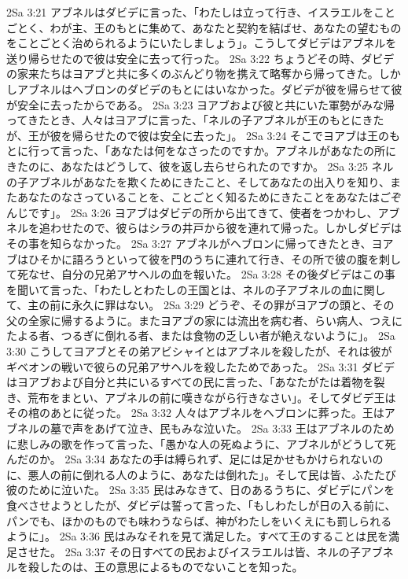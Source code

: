 2Sa 3:21  アブネルはダビデに言った、「わたしは立って行き、イスラエルをことごとく、わが主、王のもとに集めて、あなたと契約を結ばせ、あなたの望むものをことごとく治められるようにいたしましょう」。こうしてダビデはアブネルを送り帰らせたので彼は安全に去って行った。
2Sa 3:22  ちょうどその時、ダビデの家来たちはヨアブと共に多くのぶんどり物を携えて略奪から帰ってきた。しかしアブネルはヘブロンのダビデのもとにはいなかった。ダビデが彼を帰らせて彼が安全に去ったからである。
2Sa 3:23  ヨアブおよび彼と共にいた軍勢がみな帰ってきたとき、人々はヨアブに言った、「ネルの子アブネルが王のもとにきたが、王が彼を帰らせたので彼は安全に去った」。
2Sa 3:24  そこでヨアブは王のもとに行って言った、「あなたは何をなさったのですか。アブネルがあなたの所にきたのに、あなたはどうして、彼を返し去らせられたのですか。
2Sa 3:25  ネルの子アブネルがあなたを欺くためにきたこと、そしてあなたの出入りを知り、またあなたのなさっていることを、ことごとく知るためにきたことをあなたはごぞんじです」。
2Sa 3:26  ヨアブはダビデの所から出てきて、使者をつかわし、アブネルを追わせたので、彼らはシラの井戸から彼を連れて帰った。しかしダビデはその事を知らなかった。
2Sa 3:27  アブネルがヘブロンに帰ってきたとき、ヨアブはひそかに語ろうといって彼を門のうちに連れて行き、その所で彼の腹を刺して死なせ、自分の兄弟アサヘルの血を報いた。
2Sa 3:28  その後ダビデはこの事を聞いて言った、「わたしとわたしの王国とは、ネルの子アブネルの血に関して、主の前に永久に罪はない。
2Sa 3:29  どうぞ、その罪がヨアブの頭と、その父の全家に帰するように。またヨアブの家には流出を病む者、らい病人、つえにたよる者、つるぎに倒れる者、または食物の乏しい者が絶えないように」。
2Sa 3:30  こうしてヨアブとその弟アビシャイとはアブネルを殺したが、それは彼がギベオンの戦いで彼らの兄弟アサヘルを殺したためであった。
2Sa 3:31  ダビデはヨアブおよび自分と共にいるすべての民に言った、「あなたがたは着物を裂き、荒布をまとい、アブネルの前に嘆きながら行きなさい」。そしてダビデ王はその棺のあとに従った。
2Sa 3:32  人々はアブネルをヘブロンに葬った。王はアブネルの墓で声をあげて泣き、民もみな泣いた。
2Sa 3:33  王はアブネルのために悲しみの歌を作って言った、「愚かな人の死ぬように、アブネルがどうして死んだのか。
2Sa 3:34  あなたの手は縛られず、足には足かせもかけられないのに、悪人の前に倒れる人のように、あなたは倒れた」。そして民は皆、ふたたび彼のために泣いた。
2Sa 3:35  民はみなきて、日のあるうちに、ダビデにパンを食べさせようとしたが、ダビデは誓って言った、「もしわたしが日の入る前に、パンでも、ほかのものでも味わうならば、神がわたしをいくえにも罰しられるように」。
2Sa 3:36  民はみなそれを見て満足した。すべて王のすることは民を満足させた。
2Sa 3:37  その日すべての民およびイスラエルは皆、ネルの子アブネルを殺したのは、王の意思によるものでないことを知った。
